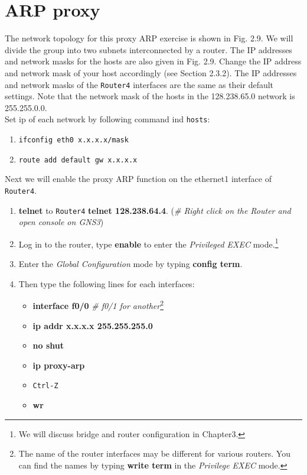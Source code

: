 \documentclass{../UTNetLab}
\begin{document}
\section{ARP proxy}
    The network topology for this proxy ARP exercise is shown in Fig. 2.9. We will divide the group into two subnets interconnected by a router. The IP addresses and network masks for the hosts are also given in Fig. 2.9. Change the IP address and network mask of your host accordingly (see Section 2.3.2). The IP addresses and network masks of the \texttt{Router4} interfaces are the same as their default settings.
    Note that the network mask of the hosts in the 128.238.65.0 network is 255.255.0.0. \\
    Set ip of each network by following command ind \texttt{hosts}:\\
    \begin{enumerate}
        \item \texttt{ifconfig eth0 x.x.x.x/mask}
        \item \texttt{route add default gw x.x.x.x}
    \end{enumerate}
    Next we will enable the proxy ARP function on the ethernet1 interface of \texttt{Router4}. \\
    \begin{enumerate}
        \item \textbf{telnet} to \texttt{Router4} \textbf{telnet 128.238.64.4}. (\textit{\# Right click on the Router and open console on GNS3})
        \item Log in to the router, type \textbf{enable} to enter the \textit{Privileged EXEC} mode.\footnote{We will discuss bridge and router configuration in Chapter3.}
        \item Enter the \textit{Global Configuration} mode by typing \textbf{config term}.
        \item Then type the following lines for each interfaces:
        \begin{itemize}
            \item \textbf{interface f0/0} \textit{\# f0/1 for another}\footnote{The name of the router interfaces may be different for various routers.
            You can find the names by typing \textbf{write term} in the \textit{Privilege EXEC} mode.}
            \item \textbf{ip addr x.x.x.x 255.255.255.0}
            \item \textbf{no shut}
            \item \textbf{ip proxy-arp}
            \item \texttt{Ctrl-Z}
            \item \textbf{wr}
        \end{itemize}
    \end{enumerate}
\end{document}
